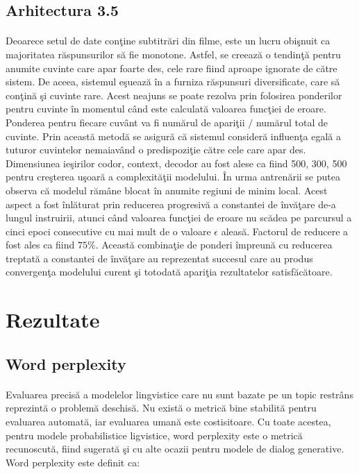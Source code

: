 \subsection{Arhitectura 3.5}

\paragraph{}
Deoarece setul de date con\c tine subtitr\u ari din filme, este un lucru obi\c snuit ca majoritatea r\u aspunsurilor s\u a fie monotone. Astfel, se creeaz\u a o tendin\c t\u a pentru anumite cuvinte care apar foarte des, cele rare fiind aproape ignorate de c\u atre sistem. De aceea, sistemul e\c sueaz\u a \^ in a furniza r\u aspunsuri diversificate, care s\u a con\c tin\u a \c si cuvinte rare. Acest neajuns se poate rezolva prin folosirea ponderilor pentru cuvinte \^ in momentul c\^ and este calculat\u a valoarea func\c tiei de eroare. Ponderea pentru fiecare cuv\^ ant va fi num\u arul de apari\c tii \(/\) num\u arul total de cuvinte. Prin aceast\u a metod\u a se asigur\u a c\u a sistemul consider\u a influen\c ta egal\u a a tuturor cuvintelor nemaiav\^ and o predispozi\c tie c\u atre cele care apar des. Dimensiunea ie\c sirilor codor, context, decodor au fost alese ca fiind 500, 300, 500 pentru cre\c sterea u\c soar\u a a complexit\u a\c tii modelului. \^ In urma antren\u arii se putea observa c\u a modelul r\u am\^ ane blocat \^ in anumite regiuni de minim local. Acest aspect a fost \^ inl\u aturat prin reducerea progresiv\u a a constantei de \^ inv\u a\c tare de-a lungul instruirii, atunci c\^ and valoarea func\c tiei de eroare nu sc\u adea pe parcursul a cinci epoci consecutive cu mai mult de o valoare \(\epsilon\) aleas\u a. Factorul de reducere a fost ales ca fiind \(75\%\). Aceast\u a combina\c tie de ponderi \^ impreun\u a cu reducerea treptat\u a a constantei de \^ inv\u a\c tare au reprezentat succesul care au produs convergen\c ta modelului curent \c si totodat\u a apari\c tia rezultatelor satisf\u ac\u atoare.

\section{Rezultate}

\subsection{Word perplexity}

\paragraph{}
Evaluarea precis\u a a modelelor lingvistice care nu sunt bazate pe un topic restr\^ ans reprezint\u a o problem\u a deschis\u a. Nu exist\u a o metric\u a bine stabilit\u a pentru evaluarea automat\u a, iar evaluarea uman\u a este costisitoare. Cu toate acestea, pentru modele probabilistice ligvistice, word perplexity este o metric\u a recunoscut\u a, fiind sugerat\u a \c si cu alte ocazii pentru modele de dialog generative. Word perplexity este definit ca:

